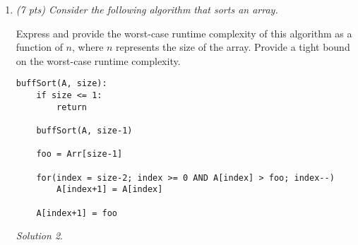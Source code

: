 \documentclass[12pt]{article}
\theoremstyle{remark}
\newtheorem*{solution}{Solution}
\newcommand{\makenonemptybox}[2]{%
\item[]
\fbox{%
\parbox[c][#1][t]{\dimexpr\linewidth-2\fboxsep-2\fboxrule}{
  \hrule width \hsize height 0pt
  #2
 }%
}%
\par\vspace{\ht\strutbox}
}
\begin{document}
\begin{enumerate}
\begin{enumerate}[label=(\alph*)]
\item (4 pts) Give a tight bound ($\Theta$ bound) on the number of {\tt return} calls this algorithm makes. Justify your answer.
\begin{solution}
\end{solution}
\end{enumerate}





\pagebreak
\item {\itshape (7 pts) Consider the following algorithm that sorts an array.

\noindent Express and provide the worst-case runtime complexity of this algorithm as a function of $n$, where $n$ represents the size of the array. Provide a tight bound on the worst-case runtime complexity.
}
\begin{verbatim}
buffSort(A, size):
    if size <= 1:
        return
    
    buffSort(A, size-1)
    
    foo = Arr[size-1]
    
    for(index = size-2; index >= 0 AND A[index] > foo; index--)
        A[index+1] = A[index]
    
    A[index+1] = foo
\end{verbatim}

\begin{solution}
\end{solution}


\end{enumerate}
\end{document}
